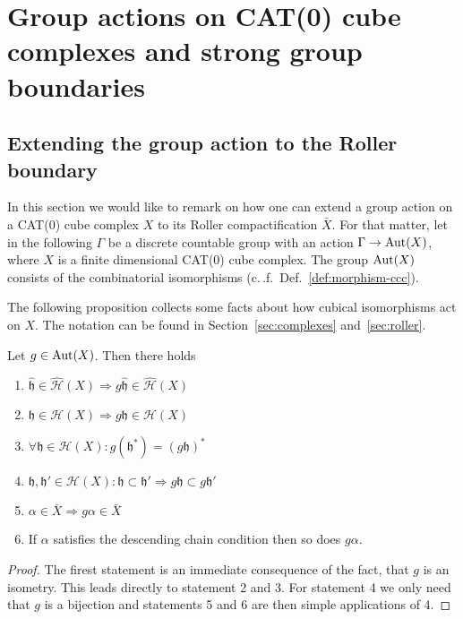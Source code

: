 \section{Group actions on CAT(0) cube complexes and strong group boundaries}
\label{sec:group}

\subsection{Extending the group action to the Roller boundary}
\label{sec:ga-roller}

In this section we would like to remark on how one can extend a group action on a CAT(0) cube complex \(X\) to its Roller compactification \(\bar X\). For that matter, let in the following \(\Gamma\) be a discrete countable group with an action \(\Gamma \to \operatorname{Aut}(X)\), where \(X\) is a finite dimensional CAT(0) cube complex. The group \(\operatorname{Aut}(X)\) consists of the combinatorial isomorphisms (c.\,.f.\ Def.~\ref{def:morphism-ccc}).

The following proposition collects some facts about how cubical isomorphisms act on \(X\). The notation can be found in Section~\ref{sec:complexes} and~\ref{sec:roller}.

\begin{prop}
  Let \(g \in \operatorname{Aut}(X)\). Then there holds
  \begin{enumerate}
  \item \(\mathfrak{\hat h} \in \mathcal{\hat H}(X) \Rightarrow  g\mathfrak{\hat h} \in \mathcal{\hat H}(X)\)
  \item \(\mathfrak{h} \in \mathcal{H}(X) \Rightarrow  g\mathfrak{h} \in \mathcal{H}(X)\)
  \item \(\forall \mathfrak{h} \in \mathcal{H}(X)\colon g(\mathfrak{h}^\ast) = (g\mathfrak{h})^\ast\)
  \item \(\mathfrak{h,h'} \in \mathcal{H}(X)\colon \mathfrak{h} \subset \mathfrak{h'} \Rightarrow g\mathfrak{h} \subset g\mathfrak{h'}\)
  \item \(\alpha \in \bar X \Rightarrow g\alpha \in \bar X\)
  \item If \(\alpha\) satisfies the descending chain condition then so does \(g\alpha\).
  \end{enumerate}
\end{prop}

\begin{proof}
  The firest statement is an immediate consequence of the fact, that \(g\) is an isometry. This leads directly to statement 2 and 3. For statement 4 we only need that \(g\) is a bijection and statements 5 and 6 are then simple applications of 4.
\end{proof}

